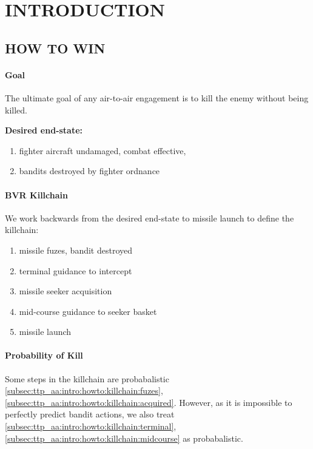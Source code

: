 \section{INTRODUCTION}
\subsection{HOW TO WIN}

\paragraph{Goal}
The ultimate goal of any air-to-air engagement is to kill the enemy without being killed. 

\medskip
\textbf{Desired end-state:}
\begin{enumerate}[label=\bfseries(\arabic*)]
    \item fighter aircraft undamaged, combat effective,
    \label{subsec:ttp_aa:intro:howto:endstate:fighter}
    \item bandits destroyed by fighter ordnance
    \label{subsec:ttp_aa:intro:howto:endstate:bandit}
\end{enumerate}

\paragraph{BVR Killchain}
We work backwards from the desired end-state 
to missile launch to define the killchain:
\begin{enumerate}[label=\textbf{(\alph*)}]
    \item missile fuzes, bandit destroyed
    \label{subsec:ttp_aa:intro:howto:killchain:fuzes}
    \item terminal guidance to intercept
    \label{subsec:ttp_aa:intro:howto:killchain:terminal}
    \item missile seeker acquisition
    \label{subsec:ttp_aa:intro:howto:killchain:acquired}
    \item mid-course guidance to seeker basket
    \label{subsec:ttp_aa:intro:howto:killchain:midcourse}
    \item missile launch
    \label{subsec:ttp_aa:intro:howto:killchain:launch}
\end{enumerate}

\paragraph{Probability of Kill}
Some steps in the killchain are probabalistic 
\ref{subsec:ttp_aa:intro:howto:killchain:fuzes},
\ref{subsec:ttp_aa:intro:howto:killchain:acquired}.
However, as it is impossible to perfectly predict bandit actions, 
we also treat 
\ref{subsec:ttp_aa:intro:howto:killchain:terminal},
\ref{subsec:ttp_aa:intro:howto:killchain:midcourse}
as probabalistic.

